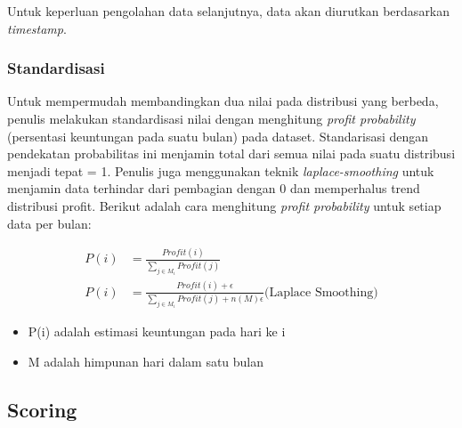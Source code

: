 \documentclass{article}
\begin{document}
\begin{adjustwidth}{4em}{0pt}
	
	\hspace{\parindent}Untuk keperluan pengolahan data selanjutnya, data akan diurutkan berdasarkan \textit{timestamp}.
	
\end{adjustwidth}

\subsubsection{Standardisasi}

\begin{adjustwidth}{4em}{0pt}
	
	\hspace{\parindent}Untuk mempermudah membandingkan dua nilai pada distribusi yang berbeda, penulis melakukan standardisasi nilai dengan menghitung \textit{profit probability} (persentasi keuntungan pada suatu bulan) pada dataset. Standarisasi dengan pendekatan probabilitas ini menjamin total dari semua nilai pada suatu distribusi menjadi tepat = 1. Penulis juga menggunakan teknik \textit{laplace-smoothing} untuk menjamin data terhindar dari pembagian dengan 0 dan memperhalus trend distribusi profit. Berikut adalah cara menghitung \textit{profit probability} untuk setiap data per bulan:
	
	\begin{align*}
	P(i) &= \frac{Profit(i)} {\sum\limits_{j \in M_i} Profit(j)}\\
	P(i) &= \frac{Profit(i)+\epsilon}{\sum\limits_{j \in M_i} Profit(j)+n(M)\epsilon} \text{(Laplace Smoothing)}
	\end{align*}
	
	\begin{itemize}
		\setlength{\itemindent}{1cm}
		\item{P(i) adalah estimasi keuntungan pada hari ke i}
		\item{M adalah himpunan hari dalam satu bulan}
	\end{itemize}
	
\end{adjustwidth}

\subsection{Scoring}
\end{document}
